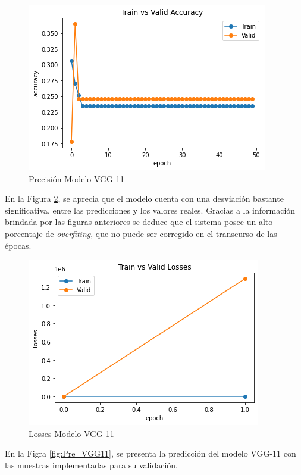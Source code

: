 			
			\begin{figure}[ht]
				\centering
				\includegraphics[scale=0.5]{Figs/105.png}
				\caption{Precisión Modelo VGG-11}
				\label{fig:precision_VGG11}
			\end{figure}
			
			En la Figura \ref{fig:loses_VGG11}, se aprecia que el modelo cuenta con una desviación bastante significativa, entre las predicciones y los valores reales. Gracias a la información brindada por las figuras anteriores se deduce que el sistema posee un alto porcentaje de \textit{overfiting}, que no puede ser corregido en el transcurso de las épocas.
			
			\begin{figure}[ht]
				\centering
				\includegraphics[scale=0.5]{Figs/106.png}
				\caption{Losses Modelo VGG-11}
				\label{fig:loses_VGG11}
			\end{figure}
			
			En la Figra \ref{fig:Pre_VGG11}, se presenta la predicción del modelo VGG-11 con las muestras implementadas para su validación.
						
